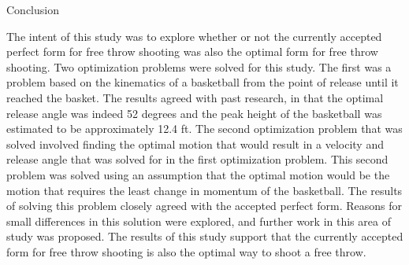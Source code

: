 
\begin{center}
\Large Conclusion
\end{center}

\begin{multicols}{2}
The intent of this study was to explore whether or not the currently accepted perfect form for free throw shooting was also the optimal form for free throw shooting. Two optimization problems were solved for this study. The first was a problem based on the kinematics of a basketball from the point of release until it reached the basket. The results agreed with past research, in that the optimal release angle was indeed 52 degrees and the peak height of the basketball was estimated to be approximately 12.4 ft. The second optimization problem that was solved involved finding the optimal motion that would result in a velocity and release angle that was solved for in the first optimization problem. This second problem was solved using an assumption that the optimal motion would be the motion that requires the least change in momentum of the basketball. The results of solving this problem closely agreed with the accepted perfect form. Reasons for small differences in this solution were explored, and further work in this area of study was proposed. The results of this study support that the currently accepted form for free throw shooting is also the optimal way to shoot a free throw.
\end{multicols}